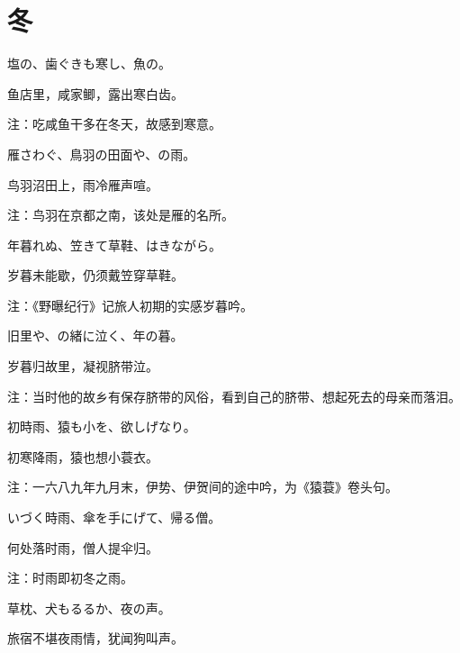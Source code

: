 \section{\FK 冬}

\setcounter{haikucounter}{0}

\begin{haiku}
    {\FH 塩の、歯ぐきも寒し、魚の。}

    {\FK 鱼店里，咸家鲫，露出寒白齿。}

    {\FT 注：吃咸鱼干多在冬天，故感到寒意。}
\end{haiku}

\begin{haiku}
    {\FH 雁さわぐ、鳥羽の田面や、の雨。}

    {\FK 鸟羽沼田上，雨冷雁声喧。}

    {\FT 注：鸟羽在京都之南，该处是雁的名所。}
\end{haiku}

\begin{haiku}
    {\FH 年暮れぬ、笠きて草鞋、はきながら。}

    {\FK 岁暮未能歇，仍须戴笠穿草鞋。}

    {\FT 注：《野曝纪行》记旅人初期的实感岁暮吟。}
\end{haiku}

\begin{haiku}
    {\FH 旧里や、の緒に泣く、年の暮。}

    {\FK 岁暮归故里，凝视脐带泣。}

    {\FT 注：当时他的故乡有保存脐带的风俗，看到自己的脐带、想起死去的母亲而落泪。}
\end{haiku}

\begin{haiku}
    {\FH 初時雨、猿も小を、欲しげなり。}

    {\FK 初寒降雨，猿也想小蓑衣。}

    {\FT 注：一六八九年九月末，伊势、伊贺间的途中吟，为《猿蓑》卷头句。}
\end{haiku}

\begin{haiku}
    {\FH いづく時雨、傘を手にげて、帰る僧。}

    {\FK 何处落时雨，僧人提伞归。}

    {\FT 注：时雨即初冬之雨。}
\end{haiku}

\begin{haiku}
    {\FH 草枕、犬もるるか、夜の声。}

    {\FK 旅宿不堪夜雨情，犹闻狗叫声。}
\end{haiku}

